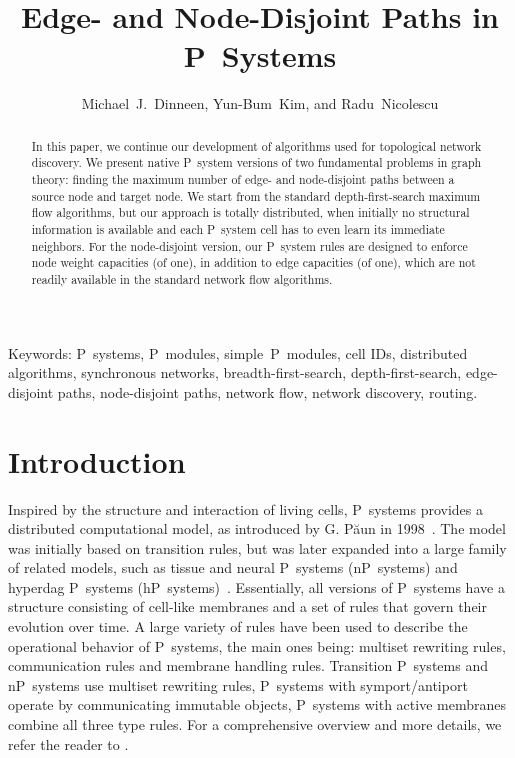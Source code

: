 \documentclass[preliminary,copyright,creativecommons]{eptcs}
\title{Edge- and Node-Disjoint Paths in P~Systems}
\author{Michael~J.~Dinneen, Yun-Bum~Kim, and Radu~Nicolescu
\institute{Department of Computer Science, University of Auckland,\\
Private Bag 92019, Auckland, New Zealand}
\email{\{mjd,yun,radu\}@cs.auckland.ac.nz}
}
\theoremstyle{remark}
\begin{document}
\maketitle


\begin{abstract}
In this paper, we continue our development of algorithms used for topological network discovery.  
We present native P~system versions of two fundamental problems in graph theory: 
finding the maximum number of edge- and node-disjoint paths between a source node and target node.  
We start from the standard depth-first-search maximum flow algorithms, 
but our approach is totally distributed, 
when initially no structural information is available
and each P~system cell has to even learn its immediate neighbors.
For the node-disjoint version, our P~system rules are designed to enforce node weight capacities (of one), 
in addition to edge capacities (of one), which are not readily available in the standard network flow algorithms.
\end{abstract}

Keywords: P~systems, P~modules, simple~P~modules, cell IDs, distributed algorithms, synchronous networks, breadth-first-search, depth-first-search, edge-disjoint paths, node-disjoint paths, network flow, network discovery, routing.


\section{Introduction}
\label{sec-introduction}

Inspired by the structure and interaction of living cells, P~systems provides a
distributed computational model, as introduced by G. P\u{a}un in
1998~\cite{Paun1998}.  The model was initially based on transition rules, but
was later expanded into a large family of related models, such as tissue and
neural P~systems (nP~systems) \cite{MartinVidePPR2003,Paun2002} and hyperdag
P~systems (hP~systems)~\cite{NDK-BWMC2009}.  Essentially, all versions of
P~systems have a structure consisting of cell-like membranes and a set of rules
that govern their evolution over time.  A large variety of rules have been used
to describe the operational behavior of P~systems, the main ones being:
multiset rewriting rules, communication rules and membrane handling rules.
Transition P~systems and nP~systems use multiset rewriting rules, P~systems
with symport/antiport operate by communicating immutable objects, P~systems
with active membranes combine all three type rules.  For a comprehensive
overview and more details, we refer the reader to \cite{Paun2002}.
\end{document}
